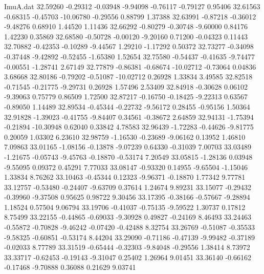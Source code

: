\begin{filecontents}{ImuA.dat}
  32.59260   -0.29312   -0.03948   -9.94098   -0.76117   -0.79127    0.95406
  32.61563   -0.68315   -0.45703  -10.06780   -0.29556    0.88799    1.37388
  32.63991   -0.87218   -0.36012   -9.48276    0.68910    1.44520    1.11436
  32.66292   -0.80279   -0.30748   -9.60000    0.84176    1.42230    0.35869
  32.68580   -0.50728   -0.00120   -9.20160    0.71200   -0.04323    0.11443
  32.70882   -0.42353   -0.10289   -9.44567    1.29210   -1.17292    0.50372
  32.73277   -0.34098   -0.37448   -9.42892   -0.52455   -1.65380    1.52654
  32.75580   -0.54437   -0.41635   -9.74477   -0.00551   -1.28741    2.67149
  32.77879   -0.86381   -0.68674  -10.02712   -0.73064    0.04836    3.68668
  32.80186   -0.79202   -0.51087  -10.02712    0.26928    1.33834    3.49585
  32.82518   -0.71545   -0.21775   -9.29731    0.26928    1.57496    2.53409
  32.84918   -0.30628    0.06102   -9.39063    0.75779    0.86509    1.72500
  32.87217   -0.16750   -0.18425   -9.22313    0.63567   -0.89050    1.14489
  32.89534   -0.45344   -0.22732   -9.56172    0.28455   -0.95156    1.50364
  32.91828   -1.39023   -0.41755   -9.84407    0.34561   -0.38672    2.64859
  32.94131   -1.75394   -0.21894  -10.30948    0.62040    0.33842    4.78583
  32.96439   -1.72283   -0.44626   -9.81775    0.20059    1.03302    6.23610
  32.98759   -1.16530   -0.23689   -9.06162    0.13952    1.46810    7.09863
  33.01165   -1.08156   -0.13878   -9.07239    0.64330   -0.31039    7.00703
  33.03489   -1.21675   -0.05743   -9.45763   -0.18870   -0.53174    7.20549
  33.05815   -1.28136    0.03948   -9.55095    0.09372    0.45291    7.77033
  33.08147   -0.93320    0.14955   -9.65504   -1.15046    1.33834    8.76262
  33.10463   -0.45344    0.12323   -9.96371   -0.18870    1.77342    9.77781
  33.12757   -0.53480   -0.24407   -9.63709    0.37614    1.24674    9.89231
  33.15077   -0.29432   -0.39960   -9.37508    0.95625    0.98722    9.30456
  33.17395   -0.38166   -0.57667   -9.28894    1.18524    0.57504    9.06794
  33.19706   -0.41037   -0.75135   -9.59522    1.30737    0.17812    8.75499
  33.22155   -0.44865   -0.69033   -9.30928    0.49827   -0.24169    8.46493
  33.24463   -0.55872   -0.70828   -9.46242   -0.07420   -0.42488    8.32754
  33.26769   -0.51087   -0.35533   -9.58325   -0.60851   -0.53174    8.44204
  33.29090   -0.71186   -0.47139   -9.99482   -0.37189   -0.02033    8.77789
  33.31519   -0.65444   -0.32303   -9.84048   -0.29556    1.38414    8.73972
  33.33717   -0.62453   -0.19143   -9.31047    0.25402    1.26964    9.01451
  33.36140   -0.66162   -0.17468   -9.70888    0.36088    0.21629    9.03741

\end{filecontents}
